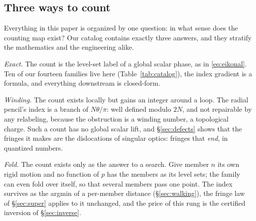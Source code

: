 \subsection{Three ways to count}
\label{sec:taxonomy}

Everything in this paper is organized by one question: in what sense does the
counting map exist? Our catalog contains exactly three answers, and they
stratify the mathematics and the engineering alike.

\emph{Exact.} The count is the level-set label of a global scalar phase, as
in \eqref{eq:eikonal}. Ten of our fourteen families live here
(Table~\ref{tab:catalog}), the index gradient is a formula, and everything
downstream is closed-form.

\emph{Winding.} The count exists locally but gains an integer around a loop.
The radial pencil's index is a branch of $N\theta/\pi$: well defined modulo
$2N$, and not repairable by any relabeling, because the obstruction is a
winding number, a topological charge. Such a count has no global scalar
lift, and \S\ref{sec:defects} shows that the fringes it makes are the
dislocations of singular optics: fringes that \emph{end}, in quantized
numbers.

\emph{Fold.} The count exists only as the answer to a search. Give member
$n$ its own rigid motion and no function of $p$ has the members as its level
sets; the family can even fold over itself, so that several members pass one
point. The index survives as the argmin of a per-member distance
(\S\ref{sec:walking}), the fringe law of \S\ref{sec:super} applies to it
unchanged, and the price of this rung is the certified inversion of
\S\ref{sec:inverse}.

